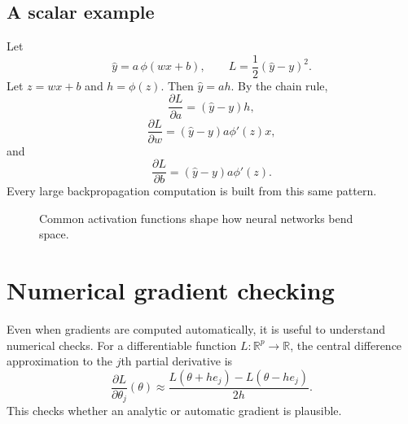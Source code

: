 \documentclass[11pt,oneside]{book}
\newcommand{\R}{\mathbb R}
\begin{document}
\subsection*{A scalar example}

Let
\[
\widehat y=a\,\phi(wx+b),
\qquad
L=\frac12(\widehat y-y)^2.
\]
Let $z=wx+b$ and $h=\phi(z)$. Then $\widehat y=ah$. By the chain rule,
\[
\frac{\partial L}{\partial a}=(\widehat y-y)h,
\]
\[
\frac{\partial L}{\partial w}=(\widehat y-y)a\phi'(z)x,
\]
and
\[
\frac{\partial L}{\partial b}=(\widehat y-y)a\phi'(z).
\]
Every large backpropagation computation is built from this same pattern.

\begin{figure}[H]
\centering
{}
\caption{Common activation functions shape how neural networks bend space.}
\end{figure}

\section{Numerical gradient checking}

Even when gradients are computed automatically, it is useful to understand numerical checks. For a differentiable function $L:\R^p\to\R$, the central difference approximation to the $j$th partial derivative is
\[
\frac{\partial L}{\partial \theta_j}(\theta)
\approx
\frac{L(\theta+h e_j)-L(\theta-h e_j)}{2h}.
\]
This checks whether an analytic or automatic gradient is plausible.
\end{document}
